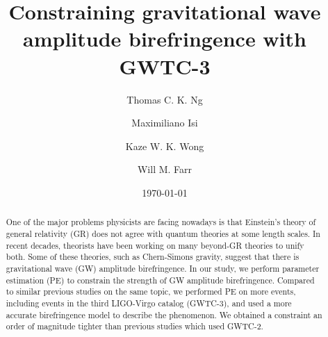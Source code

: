\documentclass[aps,prd,twocolumn,superscriptaddress,preprintnumbers,floatfix,nofootinbib]{revtex4-2}
\begin{document}
\title{Constraining gravitational wave amplitude birefringence with GWTC-3}

\author{Thomas C. K. Ng}

\author{Maximiliano Isi}

\author{Kaze W. K. Wong}

\author{Will M. Farr}

\date{\today}

\begin{abstract}
    One of the major problems physicists are facing nowadays is that Einstein's theory of general relativity (GR) does not agree with quantum theories at some length scales.
    In recent decades, theorists have been working on many beyond-GR theories to unify both.
    Some of these theories, such as Chern-Simons gravity, suggest that there is gravitational wave (GW) amplitude birefringence.
    In our study, we perform parameter estimation (PE) to constrain the strength of GW amplitude birefringence.
    Compared to similar previous studies on the same topic, we performed PE on more events, including events in the third LIGO-Virgo catalog (GWTC-3), and used a more accurate birefringence model to describe the phenomenon.
    We obtained a constraint an order of magnitude tighter than previous studies which used GWTC-2.
\end{abstract}

\maketitle
\end{document}
